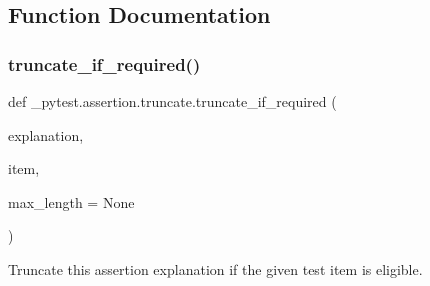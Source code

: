\subsection{Function Documentation}
\mbox{\label{namespace__pytest_1_1assertion_1_1truncate_a1bb7afee542e1bf852d62bdcd8b8c9ba}} 
\subsubsection{\texorpdfstring{truncate\+\_\+if\+\_\+required()}{truncate\_if\_required()}}
{\footnotesize\ttfamily def \+\_\+pytest.\+assertion.\+truncate.\+truncate\+\_\+if\+\_\+required (\begin{DoxyParamCaption}\item[{}]{explanation,  }\item[{}]{item,  }\item[{}]{max\+\_\+length = {\ttfamily None} }\end{DoxyParamCaption})}

\begin{DoxyVerb}Truncate this assertion explanation if the given test item is eligible.
\end{DoxyVerb}
 